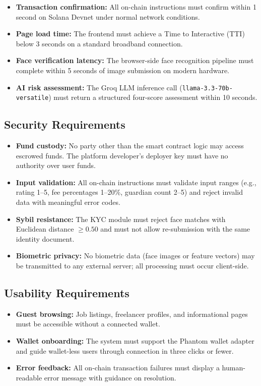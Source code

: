 \begin{itemize}
    \item \textbf{Transaction confirmation:} All on-chain instructions must confirm within 1 second on Solana Devnet under normal network conditions.
    \item \textbf{Page load time:} The frontend must achieve a Time to Interactive (TTI) below 3 seconds on a standard broadband connection.
    \item \textbf{Face verification latency:} The browser-side face recognition pipeline must complete within 5 seconds of image submission on modern hardware.
    \item \textbf{AI risk assessment:} The Groq LLM inference call (\texttt{llama-3.3-70b-versatile}) must return a structured four-score assessment within 10 seconds.
\end{itemize}

\subsection{Security Requirements}

\begin{itemize}
    \item \textbf{Fund custody:} No party other than the smart contract logic may access escrowed funds. The platform developer's deployer key must have no authority over user funds.
    \item \textbf{Input validation:} All on-chain instructions must validate input ranges (e.g., rating 1--5, fee percentages 1--20\%, guardian count 2--5) and reject invalid data with meaningful error codes.
    \item \textbf{Sybil resistance:} The KYC module must reject face matches with Euclidean distance $\geq 0.50$ and must not allow re-submission with the same identity document.
    \item \textbf{Biometric privacy:} No biometric data (face images or feature vectors) may be transmitted to any external server; all processing must occur client-side.
\end{itemize}

\subsection{Usability Requirements}

\begin{itemize}
    \item \textbf{Guest browsing:} Job listings, freelancer profiles, and informational pages must be accessible without a connected wallet.
    \item \textbf{Wallet onboarding:} The system must support the Phantom wallet adapter and guide wallet-less users through connection in three clicks or fewer.
    \item \textbf{Error feedback:} All on-chain transaction failures must display a human-readable error message with guidance on resolution.
\end{itemize}

